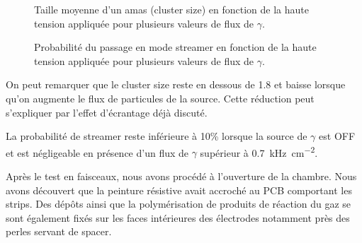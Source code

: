 \begin{figure}
	\centering
	\caption{Taille moyenne d'un amas (cluster size) en fonction de la haute tension appliquée pour plusieurs valeurs de flux de $\gamma$.}
	\label{clustersize}
\end{figure}
\begin{figure}
	\centering
	\caption{Probabilité du passage en mode streamer en fonction de la haute tension appliquée pour plusieurs valeurs de flux de $\gamma$.}
	\label{probastreamer}
\end{figure}

On peut remarquer que le cluster size reste en dessous de \num{1.8} et baisse lorsque qu'on augmente le flux de particules de la source. Cette réduction peut s'expliquer par l'effet d'écrantage déjà discuté.

La probabilité de streamer reste inférieure à 10\% lorsque la source de $\gamma$ est OFF et est négligeable en présence d'un flux de $\gamma$ supérieur à \SI{0.7}{\kilo\hertz\per\square\centi\meter}.

Après le test en faisceaux, nous avons procédé à l'ouverture de la chambre. Nous avons découvert que la peinture résistive avait accroché au PCB comportant les strips. Des dépôts ainsi que la polymérisation de produits de réaction du gaz se sont également fixés sur les faces intérieures des électrodes notamment près des perles servant de spacer. 

